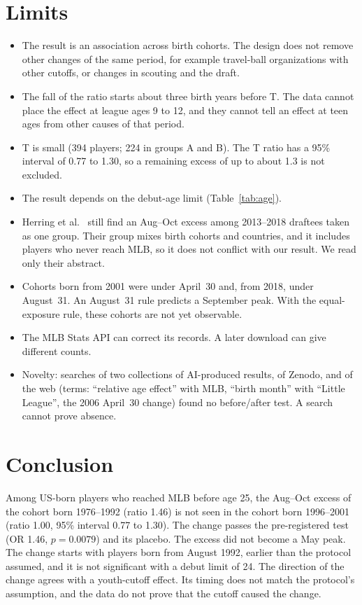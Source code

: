 \documentclass[11pt]{article}
\begin{document}
\section{Limits}
\label{sec:limits}

\begin{itemize}
\item The result is an association across birth cohorts. The design does not remove other changes of the same period, for example travel-ball organizations with other cutoffs, or changes in scouting and the draft.
\item The fall of the ratio starts about three birth years before T. The data cannot place the effect at league ages 9 to 12, and they cannot tell an effect at teen ages from other causes of that period.
\item T is small (394 players; 224 in groups A and B). The T ratio has a 95\% interval of 0.77 to 1.30, so a remaining excess of up to about 1.3 is not excluded.
\item The result depends on the debut-age limit (Table~\ref{tab:age}).
\item Herring et al.~\cite{herring2021} still find an Aug--Oct excess among 2013--2018 draftees taken as one group. Their group mixes birth cohorts and countries, and it includes players who never reach MLB, so it does not conflict with our result. We read only their abstract.
\item Cohorts born from 2001 were under April~30 and, from 2018, under August~31. An August~31 rule predicts a September peak. With the equal-exposure rule, these cohorts are not yet observable.
\item The MLB Stats API can correct its records. A later download can give different counts.
\item Novelty: searches of two collections of AI-produced results, of Zenodo, and of the web (terms: ``relative age effect'' with MLB, ``birth month'' with ``Little League'', the 2006 April~30 change) found no before/after test. A search cannot prove absence.
\end{itemize}

\section{Conclusion}

Among US-born players who reached MLB before age 25, the Aug--Oct excess of the cohort born 1976--1992 (ratio 1.46) is not seen in the cohort born 1996--2001 (ratio 1.00, 95\% interval 0.77 to 1.30). The change passes the pre-registered test (OR 1.46, $p = 0.0079$) and its placebo. The excess did not become a May peak. The change starts with players born from August 1992, earlier than the protocol assumed, and it is not significant with a debut limit of 24. The direction of the change agrees with a youth-cutoff effect. Its timing does not match the protocol's assumption, and the data do not prove that the cutoff caused the change.
\end{document}
